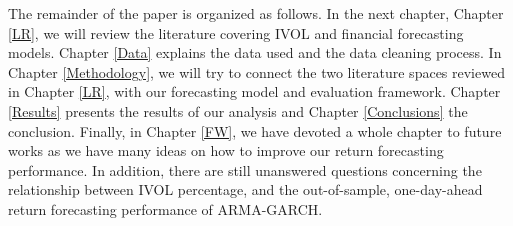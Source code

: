 The remainder of the paper is organized as follows. In the next chapter, Chapter \ref{LR}, we will review the literature covering IVOL and financial forecasting models. Chapter \ref{Data} explains the data used and the data cleaning process. In Chapter \ref{Methodology}, we will try to connect the two literature spaces reviewed in Chapter \ref{LR}, with our forecasting model and evaluation framework. Chapter \ref{Results} presents the results of our analysis and Chapter \ref{Conclusions} the conclusion. Finally, in Chapter \ref{FW}, we have devoted a whole chapter to future works as we have many ideas on how to improve our return forecasting performance. In addition, there are still unanswered questions concerning the relationship between IVOL percentage, and the out-of-sample, one-day-ahead return forecasting performance of ARMA-GARCH.

